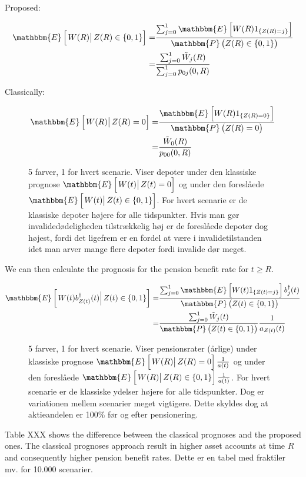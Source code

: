 \documentclass{book}
\newcommand{\1}[1]{\mathbbm{1}_{\left\lbrace #1 \right\rbrace}}
\newcommand{\expec}[1][def]{\mathbbm{E} \left[ #1 \right]}
\newcommand{\econd}[2][def]{\mathbbm{E} \left[ \left. #1 \right| #2 \right]}
\newcommand{\probability}[1][def]{\mathbbm{P} \left( #1 \right)}
\theoremstyle{break}
\theoremstyle{remark}
\numberwithin{equation}{section}
\begin{document}
\begin{example}
Proposed:

\begin{align*}
\econd[W(R)]{Z(R) \in \{0,1\}} =& \frac{\sum_{j =0}^1 \expec[W(R) 1_{\{Z(R)=j\}}]}{\probability[Z(R) \in \{0,1\}]} \\
=& \frac{\sum_{j =0}^1 \tilde{W}_j(R)}{\sum_{j =0}^1 p_{0j}(0,R)}
\end{align*}

Classically:

\begin{align*}
\econd[W(R)]{Z(R) = 0} =& \frac{\expec[W(R) 1_{\{Z(R)=0\}}]}{\probability[Z(R) = 0]} \\
=& \frac{\tilde{W}_0(R)}{p_{00}(0,R)}
\end{align*} 

\begin{figure}[H]
	\caption{5 farver, 1 for hvert scenarie. Viser depoter under den klassiske prognose $\econd[W(t)]{Z(t) = 0}$ og under den foreslåede $\econd[W(t)]{Z(t) \in \{0,1\}}$. For hvert scenarie er de klassiske depoter højere for alle tidspunkter. Hvis man gør invalidedødeligheden tilstrækkelig høj er de foreslåede depoter dog højest, fordi det ligefrem er en fordel at være i invalidetilstanden idet man arver mange flere depoter fordi invalide dør meget.}
\end{figure}

We can then calculate the prognosis for the pension benefit rate for $ t\geq R$.

\begin{align*}
\econd[W(t) b_{Z(t)}^\dagger(t)]{Z(t) \in \{0,1\}} =& \frac{\sum_{j =0}^1 \expec[W(t) 1_{\{Z(t)=j\}}] b_j^{\dagger}(t)}{\probability[Z(t) \in \{0,1\}]} \\
=& \frac{\sum_{j =0}^1 \tilde{W}_j(t)}{\probability[Z(t) \in \{0,1\}]} \frac{1}{a_{Z(t)}(t)}
\end{align*}

\begin{figure}[H]
	\caption{5 farver, 1 for hvert scenarie. Viser pensionsrater (årlige) under klassiske prognose $\econd[W(R)]{Z(R) = 0}\frac{1}{a(t)}$ og under den foreslåede $\econd[W(R)]{Z(R) \in \{0,1\}}\frac{1}{a(t)}$. For hvert scenarie er de klassiske ydelser højere for alle tidspunkter. Dog er variationen mellem scenarier meget vigtigere. Dette skyldes dog at aktieandelen er 100\% før og efter pensionering.}
\end{figure}

Table XXX shows the difference between the classical prognoses and the proposed ones. The classical prognoses approach result in higher asset accounts at time $R$ and consequently higher pension benefit rates. Dette er en tabel med fraktiler mv. for 10.000 scenarier.

\end{example}
\end{document}

